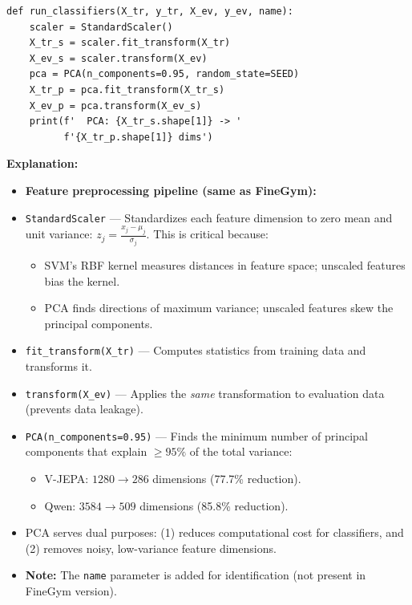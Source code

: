 \documentclass[a4paper, 12pt]{article}
\newenvironment{explanation}{%
  \par\smallskip
  \noindent\textcolor{blue!70!black}{\textbf{Explanation:}}\\
  \noindent
}{\par\medskip}
\begin{document}
\begin{lstlisting}
def run_classifiers(X_tr, y_tr, X_ev, y_ev, name):
    scaler = StandardScaler()
    X_tr_s = scaler.fit_transform(X_tr)
    X_ev_s = scaler.transform(X_ev)
    pca = PCA(n_components=0.95, random_state=SEED)
    X_tr_p = pca.fit_transform(X_tr_s)
    X_ev_p = pca.transform(X_ev_s)
    print(f'  PCA: {X_tr_s.shape[1]} -> '
          f'{X_tr_p.shape[1]} dims')
\end{lstlisting}

\begin{explanation}
\begin{itemize}[nosep]
  \item \textbf{Feature preprocessing pipeline (same as FineGym):}
  \item \texttt{StandardScaler} --- Standardizes each feature dimension to zero mean and unit variance: $z_j = \frac{x_j - \mu_j}{\sigma_j}$. This is critical because:
  \begin{itemize}[nosep]
    \item SVM's RBF kernel measures distances in feature space; unscaled features bias the kernel.
    \item PCA finds directions of maximum variance; unscaled features skew the principal components.
  \end{itemize}
  \item \texttt{fit\_transform(X\_tr)} --- Computes statistics from training data and transforms it.
  \item \texttt{transform(X\_ev)} --- Applies the \textit{same} transformation to evaluation data (prevents data leakage).
  \item \texttt{PCA(n\_components=0.95)} --- Finds the minimum number of principal components that explain $\geq 95\%$ of the total variance:
  \begin{itemize}[nosep]
    \item V-JEPA: $1280 \to 286$ dimensions (77.7\% reduction).
    \item Qwen: $3584 \to 509$ dimensions (85.8\% reduction).
  \end{itemize}
  \item PCA serves dual purposes: (1) reduces computational cost for classifiers, and (2) removes noisy, low-variance feature dimensions.
  \item \textbf{Note:} The \texttt{name} parameter is added for identification (not present in FineGym version).
\end{itemize}
\end{explanation}
\end{document}
